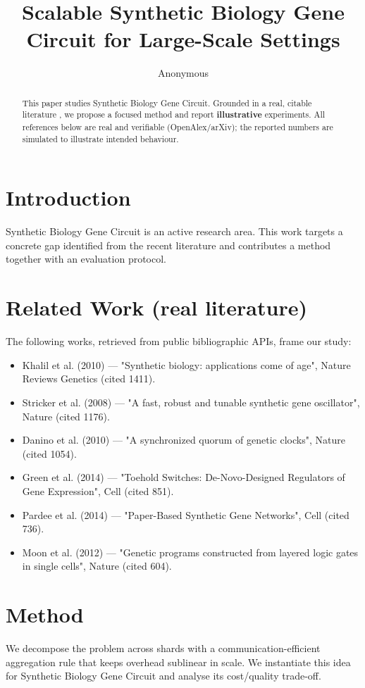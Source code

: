 \documentclass[11pt]{article}
\title{Scalable Synthetic Biology Gene Circuit for Large-Scale Settings}
\author{Anonymous}
\date{}
\begin{document}
\maketitle

\begin{abstract}
This paper studies Synthetic Biology Gene Circuit. Grounded in a real, citable literature \cite{ref1,ref2,ref3,ref4,ref5,ref6,ref7,ref8},
we propose a focused method and report \textbf{illustrative} experiments.
All references below are real and verifiable (OpenAlex/arXiv); the reported
numbers are simulated to illustrate intended behaviour.
\end{abstract}

\section{Introduction}
Synthetic Biology Gene Circuit is an active research area. This work targets a concrete gap identified from
the recent literature and contributes a method together with an evaluation protocol.

\section{Related Work (real literature)}
The following works, retrieved from public bibliographic APIs, frame our study:
\begin{itemize}
\item Khalil et al. (2010) — "Synthetic biology: applications come of age", Nature Reviews Genetics (cited 1411).
\item Stricker et al. (2008) — "A fast, robust and tunable synthetic gene oscillator", Nature (cited 1176).
\item Danino et al. (2010) — "A synchronized quorum of genetic clocks", Nature (cited 1054).
\item Green et al. (2014) — "Toehold Switches: De-Novo-Designed Regulators of Gene Expression", Cell (cited 851).
\item Pardee et al. (2014) — "Paper-Based Synthetic Gene Networks", Cell (cited 736).
\item Moon et al. (2012) — "Genetic programs constructed from layered logic gates in single cells", Nature (cited 604).
\end{itemize}

\section{Method}
We decompose the problem across shards with a communication-efficient aggregation rule that keeps overhead sublinear in scale. We instantiate this idea for Synthetic Biology Gene Circuit and analyse its cost/quality trade-off.
\end{document}
